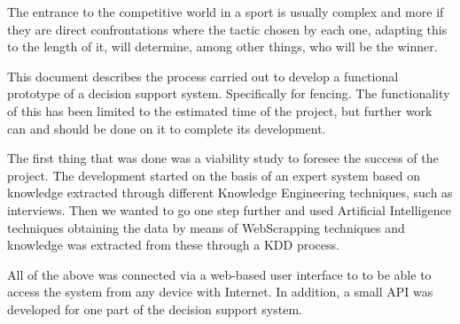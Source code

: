 The entrance to the competitive world in a sport is usually complex and more if they are
direct confrontations where the tactic chosen by each one, adapting this to
the length of it, will determine, among other things, who
will be the winner.

This document describes the process carried out to develop a functional prototype
of a decision support system. Specifically for
fencing. The functionality of this has been limited to the estimated time
of the project, but further work can and should be done on it to complete
its development.

The first thing that was done was a viability study to foresee the success of the
project. The development started on the basis of an expert system based on
knowledge extracted through different Knowledge Engineering techniques, such as interviews. Then we wanted to go one step further
and used Artificial Intelligence techniques obtaining
the data by means of WebScrapping techniques and knowledge was extracted from these
through a KDD process.

All of the above was connected via a web-based user interface to
to be able to access the system from any device with Internet. In addition,
a small API was developed for one part of the decision support system.